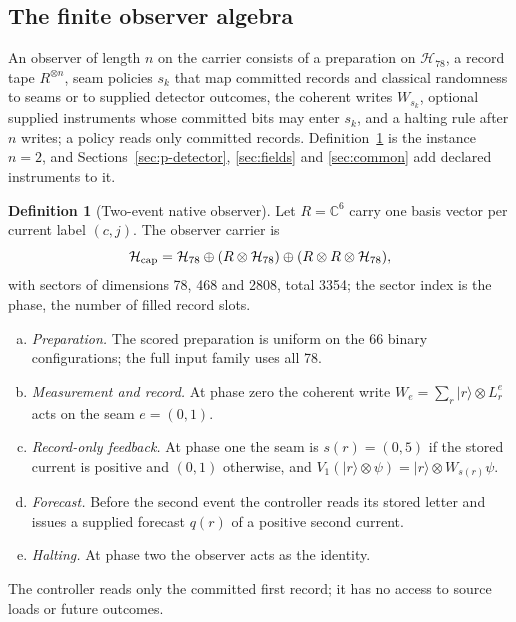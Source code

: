 \documentclass[11pt]{article}
\theoremstyle{definition}
\newtheorem{definition}[theorem]{Definition}
\theoremstyle{remark}
\theoremstyle{plain}
\newcommand{\ket}[1]{\lvert #1\rangle}
\newcommand{\C}{\mathbb{C}}
\newcommand{\Hil}{\mathcal{H}}
\begin{document}
\subsection{The finite observer algebra}
\label{sec:observer-algebra}

An observer of length $n$ on the carrier consists of a preparation on $\Hil_{78}$, a record tape $R^{\otimes n}$, seam policies $s_k$ that map committed records and classical randomness to seams or to supplied detector outcomes, the coherent writes $W_{s_k}$, optional supplied instruments whose committed bits may enter $s_k$, and a halting rule after $n$ writes; a policy reads only committed records. Definition~\ref{def:observer} is the instance $n=2$, and Sections~\ref{sec:p-detector}, \ref{sec:fields} and \ref{sec:common} add declared instruments to it.

\begin{definition}[Two-event native observer]
\label{def:observer}
Let $R=\C^6$ carry one basis vector per current label $(c,j)$. The observer
carrier is
\[
\Hil_{\rm cap}=\Hil_{78}\oplus(R\otimes\Hil_{78})\oplus(R\otimes R\otimes\Hil_{78}),
\]
with sectors of dimensions 78, 468 and 2808, total 3354; the sector index is
the phase, the number of filled record slots.
\begin{enumerate}[(a)]
\item \emph{Preparation.} The scored preparation is uniform on the 66 binary
configurations; the full input family uses all 78.
\item \emph{Measurement and record.} At phase zero the coherent write
$W_{e}=\sum_r\ket{r}\otimes L^{e}_r$ acts on the seam $e=(0,1)$.
\item \emph{Record-only feedback.} At phase one the seam is $s(r)=(0,5)$ if
the stored current is positive and $(0,1)$ otherwise, and
$V_1(\ket r\otimes\psi)=\ket r\otimes W_{s(r)}\psi$.
\item \emph{Forecast.} Before the second event the controller reads its
stored letter and issues a supplied forecast $q(r)$ of a positive second
current.
\item \emph{Halting.} At phase two the observer acts as the identity.
\end{enumerate}
The controller reads only the committed first record; it has no access to
source loads or future outcomes.
\end{definition}
\end{document}
